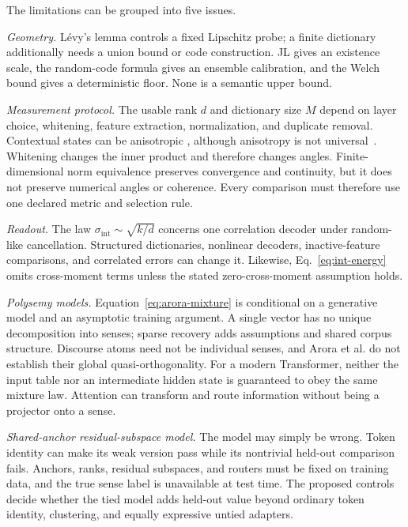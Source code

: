 \documentclass[
  aps,
  reprint,
  superscriptaddress,
  floatfix,
  nofootinbib,
  longbibliography
]{revtex4-2}
\newcommand{\Msem}{M}
\newcommand{\sint}{\sigma_{\mathrm{int}}}
\begin{document}
The limitations can be grouped into five issues.

\emph{Geometry.}  L\'evy's lemma controls a fixed Lipschitz probe; a finite
dictionary additionally needs a union bound or code construction.  JL gives
an existence scale, the random-code formula gives an ensemble calibration,
and the Welch bound gives a deterministic floor.  None is a semantic upper
bound.

\emph{Measurement protocol.}  The usable rank $d$ and dictionary size $\Msem$
depend on layer choice, whitening, feature extraction, normalization, and
duplicate removal.  Contextual states can be anisotropic
\cite{ethayarajh2019,gao2019representation,mu2018allbutthetop,razzhigaev2024shape},
although anisotropy is not universal~\cite{machina2024anisotropy}.  Whitening
changes the inner product and therefore changes angles.  Finite-dimensional
norm equivalence preserves convergence and continuity, but it does not
preserve numerical angles or coherence.  Every comparison must therefore use
one declared metric and selection rule.

\emph{Readout.}  The law $\sint\sim\sqrt{k/d}$ concerns one correlation
decoder under random-like cancellation.  Structured dictionaries, nonlinear
decoders, inactive-feature comparisons, and correlated errors can change it.
Likewise, Eq.~\eqref{eq:int-energy} omits cross-moment terms unless the stated
zero-cross-moment assumption holds.

\emph{Polysemy models.}  Equation~\eqref{eq:arora-mixture} is conditional on a
generative model and an asymptotic training argument.  A single vector has no
unique decomposition into senses; sparse recovery adds assumptions and shared
corpus structure.  Discourse atoms need not be individual senses, and Arora
et al. do not establish their global quasi-orthogonality.  For a modern
Transformer, neither the input table nor an intermediate hidden state is
guaranteed to obey the same mixture law.  Attention can transform and route
information without being a projector onto a sense.

\emph{Shared-anchor residual-subspace model.}  The model may simply be wrong.  Token identity
can make its weak version pass while its nontrivial held-out comparison fails.
Anchors, ranks, residual subspaces, and routers must be fixed on training data, and the true
sense label is unavailable at test time.  The proposed controls decide whether
the tied model adds held-out value beyond ordinary token identity, clustering,
and equally expressive untied adapters.
\end{document}
